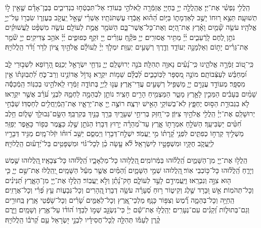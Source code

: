 \documentclass[twoside, openany, parskip=half, 11pt]{book}
\begin{document}
\ashrei

\clearpage

הַֽלֲלִ֥י נַפְשִׁ֗י אֶת־יְיָ׃
אֲהַֽלֲלָ֣ה יְיָ֣ בְּחַיָּי֑ אֲזַמְּֿרָ֖ה לֵֽאלֹהַ֣י בְּעוֹדִֽי׃
אַל־תִּבְטְֿח֥וּ בִנְדִיבִ֑ים בְּבֶן־אָדָ֓ם שֶׁ֤אֵ֖ין ל֣וֹ תְשׁוּעָֽה׃
תֵּצֵ֣א ר֭וּחוֹ יָשֻׁ֣ב לְאַדְמָת֑וֹ בַּיּ֥וֹם הַ֝ה֗וּא אָֽבְֿד֥וּ עֶשְׁתֹּנֹתָֽיו׃
אַשְׁרֵ֗י שֶׁ֤אֵ֣ל יַֽעֲקֹ֣ב בְּעֶזְר֑וֹ שִׂבְר֖וֹ עַל־יְיָ֣ אֱלֹהָֽיו׃
עֹשֵׂ֤ה שָׁ֘מַ֤יִם וָאָ֗רֶץ אֶת־הַ֭יָּם וְאֶת־כָּל־אֲשֶׁר־בָּ֑ם הַשֹּׁמֵ֖ר אֱמֶ֣ת לְעוֹלָֽם׃
עֹשֶׂ֤ה מִשְׁפָּ֨ט לַֽעֲשׁוּקִ֗ים נֹתֵ֣ן לֶ֭חֶם לָֽרְֿעֵבִ֑ים יְ֜יָ֗ מַתִּ֥יר אֲסוּרִֽים׃
יְיָ֤ פֹּקֵ֤֘חַ עִוְרִ֗ים יְ֖יָ זֹקֵ֥ף כְּפוּפִ֑ים יְ֜יָ֗ אֹהֵ֥ב צַדִּיקִֽים׃
יְיָ֤ שֹׁ֘מֵ֤ר אֶת־גֵּרִ֗ים יָת֣וֹם וְאַלְמָנָ֣ה יְעוֹדֵ֑ד וְדֶ֖רֶךְ רְשָׁעִ֣ים יְעַוֵּֽת׃
יִמְלֹ֤ךְ יְיָ֨ לְֽעוֹלָ֗ם אֱלֹהַ֣יִךְ צִ֭יּוֹן לְדֹ֥ר וָ֝דֹ֗ר הַֽלֲלוּיָֽהּ׃


כִּֽי־ט֭וֹב זַמְּֿרָ֣ה אֱלֹהֵ֑ינוּ כִּֽי־נָ֝עִ֗ים נָאוָ֥ה תְהִלָּֽה׃
בֹּנֵ֣ה יְרוּשָׁלַֽםִ יְיָ֑ נִדְחֵ֖י יִשְׂרָאֵ֣ל יְכַנֵּֽס׃
הָ֭ר֣וֹפֵא לִשְׁב֣וּרֵי לֵ֑ב וּ֝מְחַבֵּ֗שׁ לְעַצְּֿבוֹתָֽם׃
מוֹנֶ֣ה מִ֭סְפָּר לַכּֽוֹכָבִ֑ים לְ֝כֻלָּ֗ם שֵׁמ֥וֹת יִקְרָֽא׃
גָּדוֹ֣ל אֲדוֹנֵ֣ינוּ וְרַב־כֹּ֑חַ לִ֝תְבֽוּנָת֗וֹ אֵ֣ין מִסְפָּֽר׃
מְעוֹדֵ֣ד עֲנָוִ֣ים יְיָ֑ מַשְׁפִּ֖יל רְשָׁעִ֣ים עֲדֵי־אָֽרֶץ׃
עֶנ֣וּ לַֽיְיָ֣ בְּתוֹדָ֑ה זַמְּֿר֖וּ לֵֽאלֹהֵ֣ינוּ בְכִנּֽוֹר׃
הַֽמְֿכַסֶּ֬ה שָׁמַ֨יִם בְּעָבִ֗ים הַמֵּכִ֣ין לָאָ֣רֶץ מָטָ֑ר הַמַּצְמִ֖יחַ הָרִ֣ים חָצִֽיר׃
נוֹתֵ֣ן לִבְהֵמָ֣ה לַחְמָ֑הּ לִבְנֵ֥י עֹ֝רֵ֗ב אֲשֶׁ֣ר יִקְרָֽאוּ׃
לֹ֤א בִגְבוּרַ֣ת הַסּ֣וּס יֶחְפָּ֑ץ לֹֽא־בְשׁוֹקֵ֖י הָאִ֣ישׁ יִרְצֶֽה׃
רוֹצֶ֣ה יְ֖יָ אֶת־יְרֵאָ֑יו אֶת־הַֽמְֿיַֽחֲלִ֥ים לְחַסְדּֽוֹ׃
שַׁבְּֿחִ֣י יְרוּשָׁלַֽםִ אֶת־יְיָ֗ הַֽלֲלִ֖י אֱלֹהַ֣יִךְ צִיּוֹֽן׃
כִּי־חִ֭זַּק בְּרִיחֵ֣י שְׁעָרָ֑יִךְ בֵּרַ֖ךְ בָּנַ֣יִךְ בְּקִרְבֵּֽךְ׃
הַשָּׂ֣ם־גְּבוּלֵ֥ךְ שָׁל֑וֹם חֵ֥לֶב חִ֝טִּ֗ים יַשְׂבִּיעֵֽךְ׃
הַשֹּׁלֵ֣חַ אִמְרָת֣וֹ אָ֑רֶץ עַד־מְ֝הֵרָ֗ה יָר֥וּץ דְּבָרֽוֹ׃
הַנֹּתֵ֣ן שֶׁ֣לֶג כַּצָּ֑מֶר כְּפ֖וֹר כָּאֵ֣פֶר יְפַזֵּֽר׃
מַשְׁלִ֣יךְ קַרְח֣וֹ כְפִתִּ֑ים לִפְנֵ֥י קָֽ֝רָת֗וֹ מִ֣י יַֽעֲמֹֽד׃
יִשְׁלַ֣ח־דְּבָר֥וֹ וְיַמְסֵ֑ם יַשֵּׁ֥ב ר֝וּח֗וֹ יִזְּֿלוּ־מָֽיִם׃
מַגִּ֣יד דְּבָרָ֣יו לְיַֽעֲקֹ֑ב חֻקָּ֖יו וּמִשְׁפָּטָ֣יו לְיִשְׂרָאֵֽל׃
לֹ֘א עָ֤שָׂה כֵ֨ן לְכָל־גּ֗וֹי וּמִשְׁפָּטִ֥ים בַּל־יְ֝דָע֗וּם הַֽלֲלוּיָֽהּ׃


 
הַֽלֲל֣וּ אֶת־יְ֖יָ מִן־הַשָּׁמַ֑יִם הַֽ֝לֲל֗וּהוּ בַּמְּֿרוֹמִֽים׃
֖הַֽלֲל֥וּהוּ כָל־מַלְאָכָ֑יו הַֽ֝לֲל֗וּהוּ כָּל־צְבָאָֽיו׃
֖הַֽלֲלוּהוּ שֶׁ֣מֶשׁ וְיָרֵ֑חַ הַֽ֝לֲל֗וּהוּ כָּל־כּ֥וֹכְבֵי אֽוֹר׃
֖הַֽלֲלוּהוּ שְׁמֵ֣י הַשָּׁמָ֑יִם וְ֝הַמַּ֗יִם אֲשֶׁ֤ר מֵעַ֬ל הַשָּׁמָֽיִם׃
יְ֭הַֽלֲלוּ אֶת־שֵׁ֣ם יְיָ֑ כִּ֤י ה֖וּא צִוָּ֣ה וְנִבְרָֽאוּ׃
וַיַּֽעֲמִידֵ֣ם לָעַ֣ד לְעוֹלָ֑ם חָק־נָ֝תַ֗ן וְלֹ֣א יַֽעֲבֽוֹר׃
הַֽלֲל֣וּ אֶת־יְ֖יָ מִן־הָאָ֑רֶץ תַּ֝נִּינִ֗ים וְכָל־תְּהֹמֽוֹת׃
אֵ֣שׁ וּ֭בָרָד שֶׁ֣לֶג וְקִיט֑וֹר ר֥וּחַ סְ֝עָרָ֗ה עֹשָׂ֥ה דְבָרֽוֹ׃
֖הֶֽהָרִים וְכָל־גְּבָע֑וֹת עֵ֥ץ פְּ֝רִ֗י וְכָל־אֲרָזִֽים׃
הַֽחַיָּ֥ה וְכָל־בְּהֵמָ֑ה רֶ֝֗מֶשׂ וְצִפּ֥וֹר כָּנָֽף׃
מַלְכֵי־אֶֽ֭רֶץ וְכָל־לְאֻמִּ֑ים שָׂ֝רִ֗ים וְכָל־שֹׁ֥פְֿטֵי אָֽרֶץ׃
בַּֽחוּרִ֥ים וְגַם־בְּתוּל֑וֹת זְ֝קֵנִ֗ים עִם־נְעָרִֽים׃
יְהַֽלֲל֤וּ אֶת־שֵׁ֬ם יְיָ֗ כִּי־נִשְׂגָּ֣ב שְׁמ֣וֹ לְבַדּ֑וֹ ה֝וֹד֗וֹ עַל־אֶ֥רֶץ וְשָׁמָֽיִם׃
וַיָּ֤רֶם קֶ֨רֶן לְעַמּ֡וֹ תְּהִלָּ֤ה לְֽכָל־חֲסִידָ֗יו לִבְנֵ֣י יִ֭שְׂרָאֵל עַ֥ם קְ֝רֹב֗וֹ הַֽלֲלוּיָֽהּ׃
\end{document}
